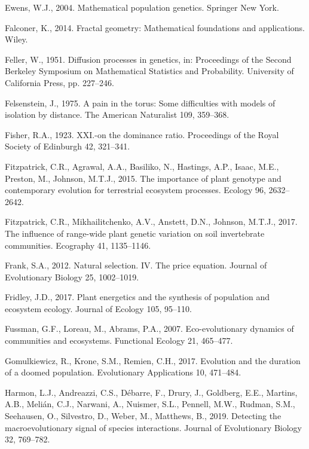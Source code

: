 \documentclass[]{elsarticle} %
\begin{document}
\leavevmode\hypertarget{ref-Ewens2004}{}%
Ewens, W.J., 2004. Mathematical population genetics. Springer New York.

\leavevmode\hypertarget{ref-kennethfalconer2014}{}%
Falconer, K., 2014. Fractal geometry: Mathematical foundations and
applications. Wiley.

\leavevmode\hypertarget{ref-feller1951}{}%
Feller, W., 1951. Diffusion processes in genetics, in: Proceedings of
the Second Berkeley Symposium on Mathematical Statistics and
Probability. University of California Press, pp. 227--246.

\leavevmode\hypertarget{ref-Felsenstein1975}{}%
Felsenstein, J., 1975. A pain in the torus: Some difficulties with
models of isolation by distance. The American Naturalist 109, 359--368.

\leavevmode\hypertarget{ref-Fisher1923}{}%
Fisher, R.A., 1923. XXI.-on the dominance ratio. Proceedings of the
Royal Society of Edinburgh 42, 321--341.

\leavevmode\hypertarget{ref-Fitzpatrick2015}{}%
Fitzpatrick, C.R., Agrawal, A.A., Basiliko, N., Hastings, A.P., Isaac,
M.E., Preston, M., Johnson, M.T.J., 2015. The importance of plant
genotype and contemporary evolution for terrestrial ecosystem processes.
Ecology 96, 2632--2642.

\leavevmode\hypertarget{ref-Fitzpatrick2017}{}%
Fitzpatrick, C.R., Mikhailitchenko, A.V., Anstett, D.N., Johnson,
M.T.J., 2017. The influence of range-wide plant genetic variation on
soil invertebrate communities. Ecography 41, 1135--1146.

\leavevmode\hypertarget{ref-FRANK2012}{}%
Frank, S.A., 2012. Natural selection. IV. The price equation. Journal of
Evolutionary Biology 25, 1002--1019.

\leavevmode\hypertarget{ref-Fridley2017}{}%
Fridley, J.D., 2017. Plant energetics and the synthesis of population
and ecosystem ecology. Journal of Ecology 105, 95--110.

\leavevmode\hypertarget{ref-FUSSMANN2007}{}%
Fussman, G.F., Loreau, M., Abrams, P.A., 2007. Eco-evolutionary dynamics
of communities and ecosystems. Functional Ecology 21, 465--477.

\leavevmode\hypertarget{ref-Gomulkiewicz2017}{}%
Gomulkiewicz, R., Krone, S.M., Remien, C.H., 2017. Evolution and the
duration of a doomed population. Evolutionary Applications 10, 471--484.

\leavevmode\hypertarget{ref-Harmon2019}{}%
Harmon, L.J., Andreazzi, C.S., Débarre, F., Drury, J., Goldberg, E.E.,
Martins, A.B., Melián, C.J., Narwani, A., Nuismer, S.L., Pennell, M.W.,
Rudman, S.M., Seehausen, O., Silvestro, D., Weber, M., Matthews, B.,
2019. Detecting the macroevolutionary signal of species interactions.
Journal of Evolutionary Biology 32, 769--782.
\end{document}
